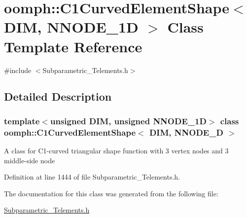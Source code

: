 \hypertarget{classoomph_1_1C1CurvedElementShape}{}\section{oomph\+:\+:C1\+Curved\+Element\+Shape$<$ D\+IM, N\+N\+O\+D\+E\+\_\+1D $>$ Class Template Reference}
\label{classoomph_1_1C1CurvedElementShape}


{\ttfamily \#include $<$Subparametric\+\_\+\+Telements.\+h$>$}



\subsection{Detailed Description}
\subsubsection*{template$<$unsigned D\+IM, unsigned N\+N\+O\+D\+E\+\_\+1D$>$\newline
class oomph\+::\+C1\+Curved\+Element\+Shape$<$ D\+I\+M, N\+N\+O\+D\+E\+\_\+D $>$}

A class for C1-\/curved triangular shape function with 3 vertex nodes and 3 middle-\/side node 

Definition at line 1444 of file Subparametric\+\_\+\+Telements.\+h.



The documentation for this class was generated from the following file\+:\begin{DoxyCompactItemize}
\item 
\hyperlink{Subparametric__Telements_8h}{Subparametric\+\_\+\+Telements.\+h}\end{DoxyCompactItemize}
